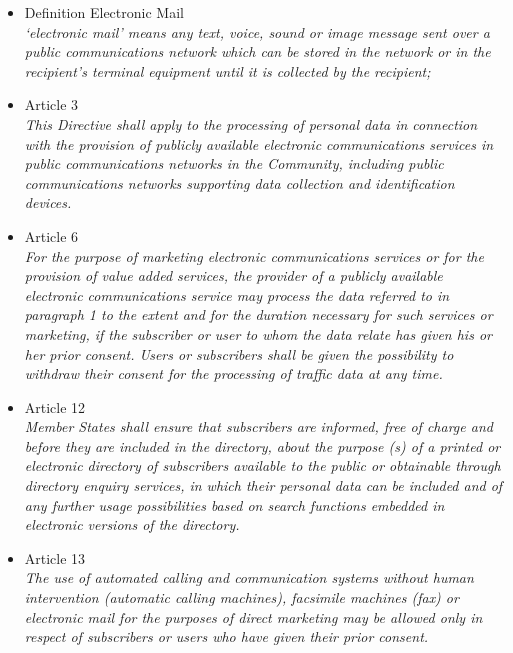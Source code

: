 \documentclass[11pt]{article}
\begin{document}
\begin{itemize}
	\item Definition Electronic Mail\\
		\emph{ ‘electronic mail’ means any text, voice, sound or image message sent over a public communications network which can be stored in the network or in the recipient's terminal equipment until it is collected by the recipient;}

	\item Article 3\\
		\emph{This Directive shall apply to the processing of personal data in connection with the provision of publicly available electronic communications services in public communications networks in the Community, including public communications networks supporting data collection and identification devices.}

	\item Article 6\\
		\emph{For the purpose of marketing electronic communications services or for the provision of value added services, the provider of a publicly available electronic communications service may process the data referred to in paragraph 1 to the extent and for the duration necessary for such services or marketing, if the subscriber or user to whom the data relate has given his or her prior consent. Users or subscribers shall be given the possibility to withdraw their consent for the processing of traffic data at any time.}

	\item Article 12\\
		\emph{Member States shall ensure that subscribers are informed, free of charge and before they are included in the directory, about the purpose (s) of a printed or electronic directory of subscribers available to the public or obtainable through directory enquiry services, in which their personal data can be included and of any further usage possibilities based on search functions embedded in electronic versions of the directory.}

	\item Article 13\\
		\emph{The use of automated calling and communication systems without human intervention (automatic calling machines), facsimile machines (fax) or electronic mail for the purposes of direct marketing may be allowed only in respect of subscribers or users who have given their prior consent.}


\end{itemize}
\end{document}
